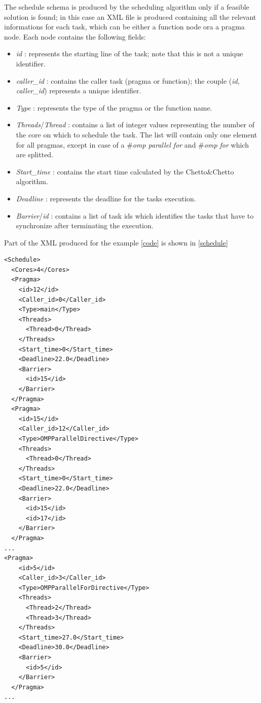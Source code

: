 \documentclass[a4paper,11pt,oneside]{book}
\begin{document}
The schedule schema is produced by the scheduling algorithm only if a feasible solution is found; in this case an XML file is produced containing all the relevant informations for each task, which can be either a function node ora a pragma node. Each node contains the following fields:
\begin{itemize}
\item{\emph{id} : represents the starting line of the task; note that this is not a unique identifier.}
\item{\emph{caller\_id} : contains the caller task (pragma or function); the couple (\emph{id}, \emph{caller\_id}) represents a unique identifier.}
\item{\emph{Type} : represents the type of the pragma or the function name. }
\item{\emph{Threads}/\emph{Thread} : contains a list of integer values representing the number of the core on which to schedule the task. The list will contain only one element for all pragmas, except in case of a \emph{$\#$omp parallel for} and \emph{$\#$omp for} which are splitted.}
\item{\emph{Start\_time} : contains the start time calculated by the Chetto\&Chetto algorithm.}
\item{\emph{Deadline} : represents the deadline for the tasks execution.}
\item{\emph{Barrier}/\emph{id} : contains a list of task ids which identifies the tasks that have to synchronize after terminating the execution.}
\end{itemize}
Part of the XML produced for the example \ref{code} is shown  in \ref{schedule}

\lstset{language=XML}
\begin{lstlisting}[caption=Schedule XML, label=schedule]
<Schedule>
  <Cores>4</Cores>
  <Pragma>
    <id>12</id>
    <Caller_id>0</Caller_id>
    <Type>main</Type>
    <Threads>
      <Thread>0</Thread>
    </Threads>
    <Start_time>0</Start_time>
    <Deadline>22.0</Deadline>
    <Barrier>
      <id>15</id>
    </Barrier>
  </Pragma>
  <Pragma>
    <id>15</id>
    <Caller_id>12</Caller_id>
    <Type>OMPParallelDirective</Type>
    <Threads>
      <Thread>0</Thread>
    </Threads>
    <Start_time>0</Start_time>
    <Deadline>22.0</Deadline>
    <Barrier>
      <id>15</id>
      <id>17</id>
    </Barrier>
  </Pragma>
...
<Pragma>
    <id>5</id>
    <Caller_id>3</Caller_id>
    <Type>OMPParallelForDirective</Type>
    <Threads>
      <Thread>2</Thread>
      <Thread>3</Thread>
    </Threads>
    <Start_time>27.0</Start_time>
    <Deadline>30.0</Deadline>
    <Barrier>
      <id>5</id>
    </Barrier>
  </Pragma>
...

\end{lstlisting}
\end{document}
